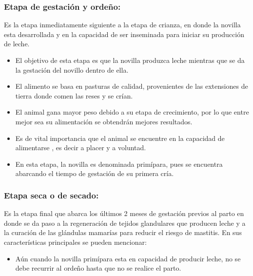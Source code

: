 	\subsubsection{Etapa de gestación y ordeño:} Es la etapa inmediatamente siguiente a la etapa de crianza, en donde la novilla esta desarrollada y en la capacidad de ser inseminada para iniciar su producción de leche.
	\begin{itemize}
		\item El objetivo de esta etapa es que la novilla produzca leche mientras que se da la gestación del novillo dentro de ella.
		\item El alimento se basa en pasturas de calidad, provenientes de las extensiones de tierra donde comen las reses y se crían.
		\item El animal gana mayor peso debido a su etapa de crecimiento, por lo que entre mejor sea su alimentación se obtendrán mejores resultados.
		\item Es de vital importancia que el animal se encuentre en la capacidad de  alimentarse , es decir a placer y a voluntad.
		\item En esta etapa, la novilla es denominada primípara, pues se encuentra abarcando el tiempo de gestación de su primera cría.\\
	\end{itemize} 
	\subsubsection{Etapa seca o de secado:} Es la etapa final que abarca los últimos 2 meses de gestación previos al parto en donde se da paso a la regeneración de tejidos glandulares que producen leche y a la curación de las glándulas mamarías para reducir el riesgo de mastitis. En sus características principales se pueden mencionar:
	\begin{itemize}
		\item Aún cuando la novilla primípara esta en capacidad de producir leche, no se debe recurrir al ordeño hasta que no se realice el parto.
	\end{itemize}

